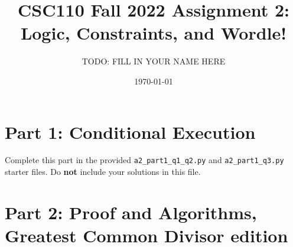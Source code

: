 \documentclass[11pt]{article}
\title{CSC110 Fall 2022 Assignment 2: Logic, Constraints, and Wordle!}
\author{TODO: FILL IN YOUR NAME HERE}
\date{\today}
\newcommand{\code}[1]{\texttt{#1}}
\begin{document}
\maketitle

\section*{Part 1: Conditional Execution}

Complete this part in the provided \code{a2\_part1\_q1\_q2.py} and \code{a2\_part1\_q3.py} starter files.
Do \textbf{not} include your solutions in this file.

\section*{Part 2: Proof and Algorithms, Greatest Common Divisor edition}
\end{document}
